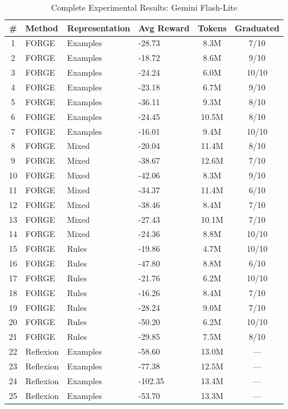\documentclass[sigconf]{acmart}
\begin{document}
\begin{table}[htbp]
\centering
\scriptsize
\caption{Complete Experimental Results: Gemini Flash-Lite}
\label{tab:full-results-gemini}
\begin{tabular}{clllcc}
\toprule
\textbf{\#} & \textbf{Method} & \textbf{Representation} & \textbf{Avg Reward} & \textbf{Tokens} & \textbf{Graduated} \\
\midrule 
1 & FORGE & Examples & -28.73 & 8.3M & 7/10 \\
2 & FORGE & Examples & -18.72 & 8.6M & 9/10 \\
3 & FORGE & Examples & -24.24 & 6.0M & 10/10 \\
4 & FORGE & Examples & -23.18 & 6.7M & 9/10 \\
5 & FORGE & Examples & -36.11 & 9.3M & 8/10 \\
6 & FORGE & Examples & -24.45 & 10.5M & 8/10 \\
7 & FORGE & Examples & -16.01 & 9.4M & 10/10 \\
8 & FORGE & Mixed & -20.04 & 11.4M & 8/10 \\
9 & FORGE & Mixed & -38.67 & 12.6M & 7/10 \\
10 & FORGE & Mixed & -42.06 & 8.3M & 9/10 \\
11 & FORGE & Mixed & -34.37 & 11.4M & 6/10 \\
12 & FORGE & Mixed & -38.46 & 8.4M & 7/10 \\
13 & FORGE & Mixed & -27.43 & 10.1M & 7/10 \\
14 & FORGE & Mixed & -24.36 & 8.8M & 10/10 \\
15 & FORGE & Rules & -19.86 & 4.7M & 10/10 \\
16 & FORGE & Rules & -47.80 & 8.8M & 6/10 \\
17 & FORGE & Rules & -21.76 & 6.2M & 10/10 \\
18 & FORGE & Rules & -16.26 & 8.4M & 7/10 \\
19 & FORGE & Rules & -28.24 & 9.0M & 7/10 \\
20 & FORGE & Rules & -50.20 & 6.2M & 10/10 \\
21 & FORGE & Rules & -29.85 & 7.5M & 8/10 \\
\midrule
22 & Reflexion & Examples & -58.60 & 13.0M & --- \\
23 & Reflexion & Examples & -77.38 & 12.5M & --- \\
24 & Reflexion & Examples & -102.35 & 13.4M & --- \\
25 & Reflexion & Examples & -53.70 & 13.3M & --- \\

\end{tabular}
\end{table}
\end{document}
